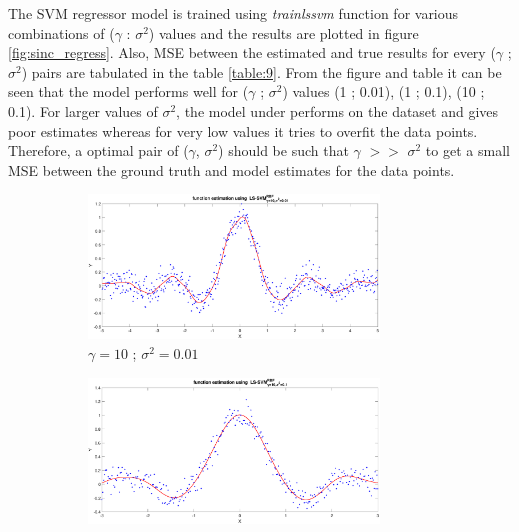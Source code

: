 The SVM regressor model is trained using \textit{trainlssvm} function for various combinations of ($\gamma$ : $\sigma^2$) values and the results are plotted in figure \ref{fig:sinc_regress}. Also, MSE between the estimated and true results for every ($\gamma$ ; $\sigma^2$) pairs are tabulated in the table \ref{table:9}. From the figure and table it can be seen that the model performs well for ($\gamma$ ; $\sigma^2 $) values (1 ; 0.01), (1 ; 0.1), (10 ; 0.1). For larger values of $\sigma^2$, the model under performs on the dataset and gives poor estimates whereas for very low values it tries to overfit the data points. Therefore, a optimal pair of ($\gamma$, $\sigma^2$) should be such that $\gamma$ $>>$ $\sigma^2$ to get a small MSE between the ground truth and model estimates for the data points.\\
\begin{figure}[ht]
	\centering
	\begin{subfigure}[b]{0.35\textwidth}
		\centering
		\captionsetup{width=0.8\linewidth}
		\includegraphics[width = 0.85\textwidth]{Exercise2/Report/Ex_1_2_1_gam(10)_sig(0.01)}
		\caption{$\gamma = 10$ ; $\sigma^2 = 0.01$}\label{fig:Ex_1_2_1_gam(10)_sig(0.01)}
	\end{subfigure}%
	\begin{subfigure}[b]{0.35\textwidth}
		\centering
		\captionsetup{width=0.8\linewidth}
		\includegraphics[width = 0.85\textwidth]{Exercise2/Report/Ex_1_2_1_gam(10)_sig(0.1)}

\end{subfigure}
\end{figure}
